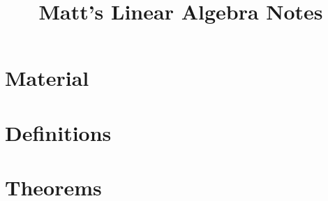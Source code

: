 \documentclass[notitlepage]{paper}
\title{Matt's Linear Algebra Notes}
\begin{document}
\maketitle

\chapter{Material}



\chapter{Definitions}



\chapter{Theorems}


\end{document}
